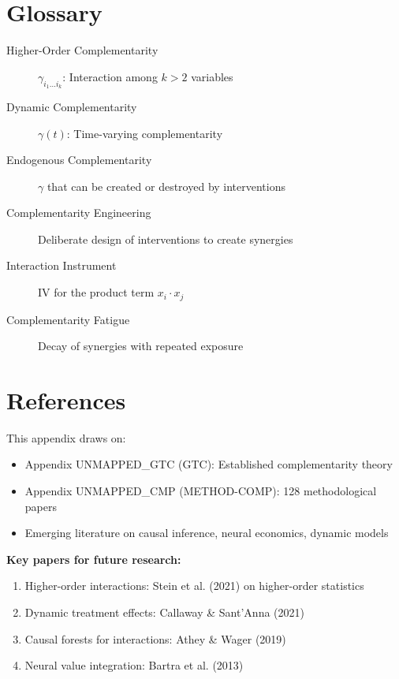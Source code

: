 \section{Glossary}
\label{sec:glossary}

\begin{description}
    \item[Higher-Order Complementarity] $\gamma_{i_1 \ldots i_k}$: Interaction among $k > 2$ variables
    \item[Dynamic Complementarity] $\gamma(t)$: Time-varying complementarity
    \item[Endogenous Complementarity] $\gamma$ that can be created or destroyed by interventions
    \item[Complementarity Engineering] Deliberate design of interventions to create synergies
    \item[Interaction Instrument] IV for the product term $x_i \cdot x_j$
    \item[Complementarity Fatigue] Decay of synergies with repeated exposure
\end{description}

\section{References}
\label{sec:references}

\nocite{bcm_master}

This appendix draws on:
\begin{itemize}[noitemsep]
    \item Appendix UNMAPPED_GTC (GTC): Established complementarity theory
    \item Appendix UNMAPPED_CMP (METHOD-COMP): 128 methodological papers
    \item Emerging literature on causal inference, neural economics, dynamic models
\end{itemize}

\textbf{Key papers for future research:}
\begin{enumerate}
    \item Higher-order interactions: Stein et al. (2021) on higher-order statistics
    \item Dynamic treatment effects: Callaway \& Sant'Anna (2021)
    \item Causal forests for interactions: Athey \& Wager (2019)
    \item Neural value integration: Bartra et al. (2013)
\end{enumerate}

